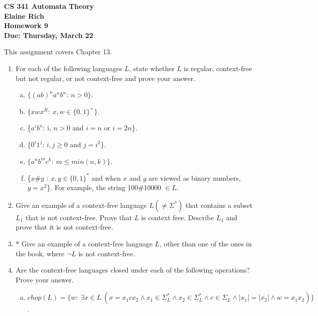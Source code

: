 \documentclass[10pt]{article}
\newcommand{\card}[1]{\left| #1 \right|}
\begin{document}
\begin{center}
\textbf{
CS 341 Automata Theory \\
Elaine Rich \\
Homework 9 \\
Due: Thursday, March 22}\\
\end{center}
\noindent
This assignment covers Chapter 13. \\

\begin{enumerate}[1)]


\item
For each of the following languages $L$, state whether $L$ is regular, context-free but not regular, or not context-free and prove your answer.
\begin{enumerate}[a)]
\item
$\{(ab)^na^nb^n:\ n > 0\}$.

\item
$\{xwx^R:\ x, w \in \{0, 1\}^+\}$.

\item
\{$a^ib^n$: i, $n > 0$ and $i = n$ or $i = 2n$\}.

\item
\{$0^i1^j$: $i, j \geq 0$ and $j = i^2$\}.

\item
$\{a^nb^mc^k:\ m \leq min(n, k)\}$.

\item
\{$x\#y$ : $x, y \in \{0, 1\}^*$ and when $x$ and $y$ are viewed as binary numbers, $y = x^2$\}.  For example, the string 100\#10000 $\in L$.
\end{enumerate}


\item
Give an example of a context-free language $L(\neq \Sigma ^*)$ that contains a subset $L_1$ that is not context-free.  Prove that $L$ is context free.  Describe $L_1$ and prove that it is not context-free.


\item
*  Give an example of a context-free language  $L$, other than one of the ones in the book, where  $\lnot L$ is not context-free.



\item
Are the context-free languages closed under each of the following operations?  Prove your answer.
\begin{enumerate}[a)]
\item
$chop(L) = \{w:\ \exists x \in L\ (x = x_1cx_2 \land x_1 \in \Sigma _L^* \land x_2 \in \Sigma _L^* \land c \in \Sigma _L \land \card{x_1} = \card{x_2} \land w = x_1x_2)\}$.


\end{enumerate}
\end{enumerate}
\end{document}

